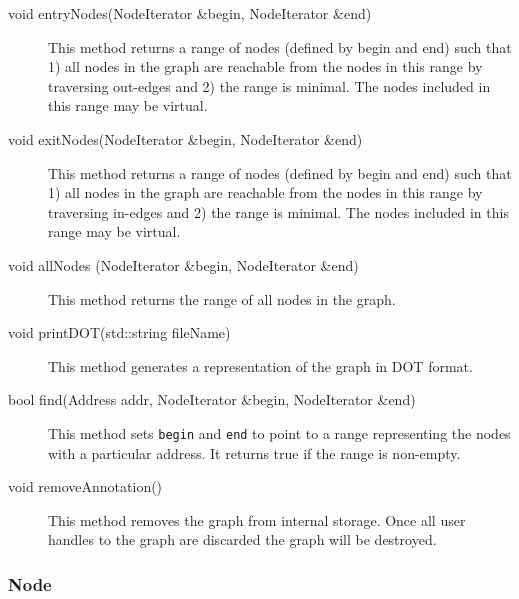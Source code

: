 \documentclass[12pt,titlepage]{article}
\begin{document}
\begin{description}

\item[void entryNodes(NodeIterator \&begin, NodeIterator \&end)] This method returns a range of nodes (defined by begin and end) such that 1) all nodes in the graph are reachable from the nodes in this range by traversing out-edges and 2) the range is minimal. The nodes included in this range may be virtual. 
\item[void exitNodes(NodeIterator \&begin, NodeIterator \&end)]
This method returns a range of nodes (defined by begin and end) such that 1) all nodes in the graph are reachable from the nodes in this range by traversing in-edges and 2) the range is minimal. The nodes included in this range may be virtual.
\item[void allNodes (NodeIterator \&begin, NodeIterator \&end)]
This method returns the range of all nodes in the graph.
\item[void printDOT(std::string fileName)]
This method generates a representation of the graph in DOT format.
\item[bool find(Address addr, NodeIterator \&begin, NodeIterator \&end)]
This method sets \texttt{begin} and \texttt{end} to point to a range
representing the nodes with a particular address. It returns true if
the range is non-empty. 
\item[void removeAnnotation()]
This method removes the graph from internal storage. Once all user handles to the graph are discarded the graph will be destroyed.
\end{description}

\subsubsection{Node}
\end{document}
